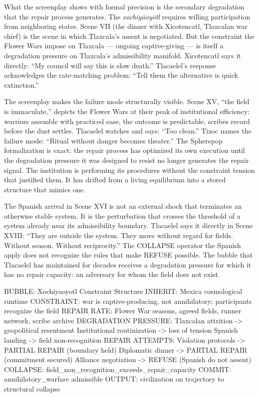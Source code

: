 \documentclass[11pt, a4paper]{article}
\theoremstyle{definition}
\theoremstyle{remark}
\begin{document}
What the screenplay shows with formal precision is the secondary degradation
that the repair process generates. The \textit{xochiy\={a}oy\={o}tl} requires
willing participation from neighboring states. Scene VII (the dinner with
Xicotencatl, Tlaxcalan war chief) is the scene in which Tlaxcala's assent
is negotiated. But the constraint the Flower Wars impose on Tlaxcala ---
ongoing captive-giving --- is itself a degradation pressure on Tlaxcala's
admissibility manifold. Xicotencatl says it directly: ``My council will say
this is slow death.'' Tlacaelel's response acknowledges the rate-matching
problem: ``Tell them the alternative is quick extinction.''

The screenplay makes the failure mode structurally visible. Scene XV,
``the field is immaculate,'' depicts the Flower Wars at their peak of
institutional efficiency: warriors assemble with practiced ease, the outcome
is predictable, scribes record before the dust settles. Tlacaelel watches
and says: ``Too clean.'' Tizoc names the failure mode: ``Ritual without danger
becomes theater.'' The Spherepop formalization is exact: the repair process has
optimized its own execution until the degradation pressure it was designed to
resist no longer generates the repair signal. The institution is performing
its procedures without the constraint tension that justified them. It has drifted
from a living equilibrium into a stored structure that mimics one.

The Spanish arrival in Scene XVI is not an external shock that terminates an
otherwise stable system. It is the perturbation that crosses the threshold of
a system already near its admissibility boundary. Tlacaelel says it directly
in Scene XVIII: ``They are outside the system. They move without regard for
fields. Without season. Without reciprocity.'' The COLLAPSE operator the Spanish
apply does not recognize the rules that make REFUSE possible. The bubble that
Tlacaelel has maintained for decades receives a degradation pressure for which
it has no repair capacity: an adversary for whom the field does not exist.

\begin{SpherepopCode}
BUBBLE: Xochiyaoyotl Constraint Structure
  INHERIT: Mexica cosmological runtime
  CONSTRAINT: war is captive-producing, not annihilatory;
              participants recognize the field
  REPAIR RATE: Flower War seasons, agreed fields,
               runner network, scribe archive
  DEGRADATION PRESSURE:
    Tlaxcalan attrition -> geopolitical resentment
    Institutional routinization -> loss of tension
    Spanish landing -> field non-recognition
  REPAIR ATTEMPTS:
    Violation protocols -> PARTIAL REPAIR (boundary held)
    Diplomatic dinner -> PARTIAL REPAIR (commitment secured)
    Alliance negotiation -> REFUSE (Spanish do not assent)
  COLLAPSE: field_non_recognition_exceeds_repair_capacity
  COMMIT: annihilatory_warfare admissible
OUTPUT: civilization on trajectory to structural collapse
\end{SpherepopCode}
\end{document}
